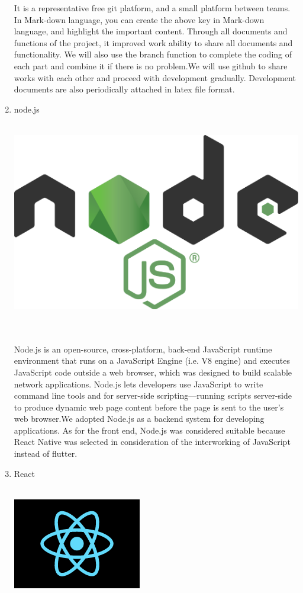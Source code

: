 \documentclass[conference]{IEEEtran}
\begin{document}
\begin{enumerate}
It is a representative free git platform, and a small platform between teams. In Mark-down language, you can create the above key in Mark-down language, and highlight the important content. Through all documents and functions of the project, it improved work ability to share all documents and functionality. We will also use the branch function to complete the coding of each part and combine it if there is no problem.We will use github to share works with each other and proceed with development gradually. Development documents are also periodically attached in latex file format.\\
	\item{node.js}\\
	\\
	\centerline{\includegraphics[scale=0.13]{pics/nodejs.png}}\\\\
Node.js is an open-source, cross-platform, back-end JavaScript runtime environment that runs on a JavaScript Engine (i.e. V8 engine) and executes JavaScript code outside a web browser, which was designed to build scalable network applications. Node.js lets developers use JavaScript to write command line tools and for server-side scripting—running scripts server-side to produce dynamic web page content before the page is sent to the user's web browser.We adopted Node.js as a backend system for developing applications. As for the front end, Node.js was considered suitable because React Native was selected in consideration of the interworking of JavaScript instead of flutter.\\
	\item{React}\\
	\\
	\centerline{\includegraphics[scale=1]{pics/React.png}}\\\\

\end{enumerate}
\end{document}
